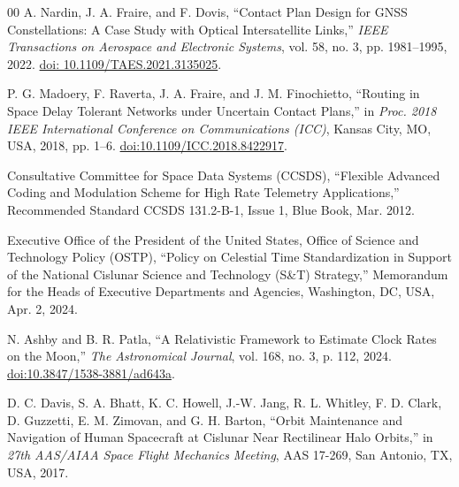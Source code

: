 \documentclass[a4paper,fleqn]{cas-sc}
\begin{document}
\begin{thebibliography}{00}
 A. Nardin, J. A. Fraire, and F. Dovis, ``Contact Plan Design for GNSS Constellations: A Case Study with Optical Intersatellite Links,'' \textit{IEEE Transactions on Aerospace and Electronic Systems}, vol. 58, no. 3, pp. 1981--1995, 2022. \href{https://doi.org/10.1109/TAES.2021.3135025}{doi: 10.1109/TAES.2021.3135025}.

 P. G. Madoery, F. Raverta, J. A. Fraire, and J. M. Finochietto, ``Routing in Space Delay Tolerant Networks under Uncertain Contact Plans,'' in \textit{Proc. 2018 IEEE International Conference on Communications (ICC)}, Kansas City, MO, USA, 2018, pp. 1--6. \href{https://doi.org/10.1109/ICC.2018.8422917}{doi:10.1109/ICC.2018.8422917}.

 Consultative Committee for Space Data Systems (CCSDS), ``Flexible Advanced Coding and Modulation Scheme for High Rate Telemetry Applications,'' Recommended Standard CCSDS 131.2-B-1, Issue 1, Blue Book, Mar. 2012.

 Executive Office of the President of the United States, Office of Science and Technology Policy (OSTP), ``Policy on Celestial Time Standardization in Support of the National Cislunar Science and Technology (S\&T) Strategy,'' Memorandum for the Heads of Executive Departments and Agencies, Washington, DC, USA, Apr. 2, 2024.

 N. Ashby and B. R. Patla, ``A Relativistic Framework to Estimate Clock Rates on the Moon,'' \textit{The Astronomical Journal}, vol. 168, no. 3, p. 112, 2024. \href{https://doi.org/10.3847/1538-3881/ad643a}{doi:10.3847/1538-3881/ad643a}.

 D. C. Davis, S. A. Bhatt, K. C. Howell, J.-W. Jang, R. L. Whitley, F. D. Clark, D. Guzzetti, E. M. Zimovan, and G. H. Barton, ``Orbit Maintenance and Navigation of Human Spacecraft at Cislunar Near Rectilinear Halo Orbits,'' in \textit{27th AAS/AIAA Space Flight Mechanics Meeting}, AAS 17-269, San Antonio, TX, USA, 2017.

\end{thebibliography}

\nolinenumbers
\end{document}
